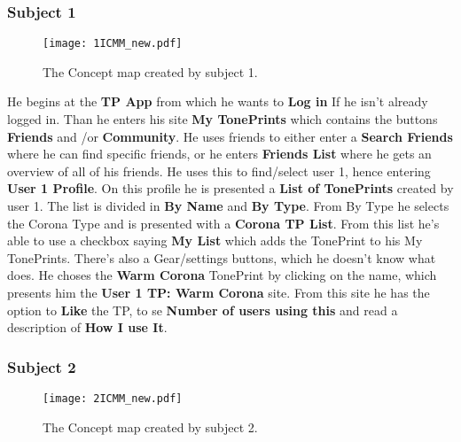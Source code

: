 
\subsubsection{Subject 1}
\label{Subject1ICMM}
\begin{figure}[H]
	\centering
	\texttt{[image: 1ICMM\_new.pdf]}
	\caption{The Concept map created by subject 1.}
	\label{fig:ICMM1}
\end{figure}

He begins at the \textbf{TP App} from which he wants to \textbf{Log in} If he isn’t already logged in. Than he enters his site \textbf{My TonePrints} which contains the buttons \textbf{Friends} and /or \textbf{Community}. He uses friends to either enter a \textbf{Search Friends} where he can find specific friends, or he enters \textbf{Friends List} where he gets an overview of all of his friends. He uses this to find/select user 1, hence entering \textbf{User 1 Profile}. On this profile he is presented a \textbf{List of TonePrints} created by user 1. The list is divided in \textbf{By Name} and \textbf{By Type}. From By Type he selects the Corona Type and is presented with a \textbf{Corona TP List}. From this list he’s able to use a checkbox saying \textbf{My List} which adds the TonePrint to his My TonePrints. There’s also a Gear/settings buttons, which he doesn’t know what does. He choses the \textbf{Warm Corona} TonePrint by clicking on the name, which presents him the \textbf{User 1 TP: Warm Corona} site. From this site he has the option to \textbf{Like} the TP, to se \textbf{Number of users using this} and read a description of \textbf{How I use It}.


\subsubsection{Subject 2}
\label{Subject2ICMM}
\begin{figure}[H]
	\centering
	\texttt{[image: 2ICMM\_new.pdf]}
	\caption{The Concept map created by subject 2.}
	\label{fig:ICMM2}
\end{figure}

